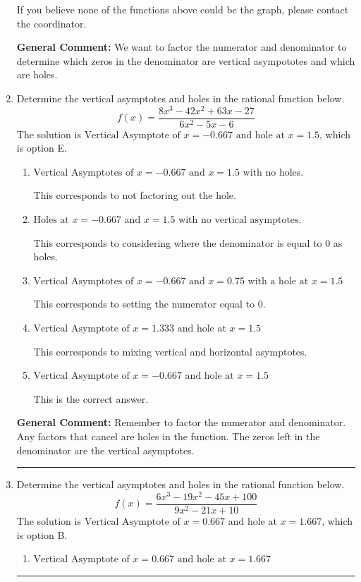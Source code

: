 \documentclass{extbook}[14pt]
\newcommand{\litem}[1]{\item #1

\rule{\textwidth}{0.4pt}}
\begin{document}
\begin{enumerate}
{\begin{enumerate}[label=\Alph*.]
If you believe none of the functions above could be the graph, please contact the coordinator.
\end{enumerate}

\textbf{General Comment:} We want to factor the numerator and denominator to determine which zeros in the denominator are vertical asympototes and which are holes.
}
\litem{
Determine the vertical asymptotes and holes in the rational function below.
\[ f(x) = \frac{8x^{3} -42 x^{2} +63 x -27}{6x^{2} -5 x -6} \]The solution is \( \text{Vertical Asymptote of } x = -0.667 \text{ and hole at } x = 1.5 \), which is option E.\begin{enumerate}[label=\Alph*.]
\item \( \text{Vertical Asymptotes of } x = -0.667 \text{ and } x = 1.5 \text{ with no holes.} \)

This corresponds to not factoring out the hole.
\item \( \text{Holes at } x = -0.667 \text{ and } x = 1.5 \text{ with no vertical asymptotes.} \)

This corresponds to considering where the denominator is equal to 0 as holes.
\item \( \text{Vertical Asymptotes of } x = -0.667 \text{ and } x = 0.75 \text{ with a hole at } x = 1.5 \)

This corresponds to setting the numerator equal to 0.
\item \( \text{Vertical Asymptote of } x = 1.333 \text{ and hole at } x = 1.5 \)

This corresponds to mixing vertical and horizontal asymptotes.
\item \( \text{Vertical Asymptote of } x = -0.667 \text{ and hole at } x = 1.5 \)

This is the correct answer.
\end{enumerate}

\textbf{General Comment:} Remember to factor the numerator and denominator. Any factors that cancel are holes in the function. The zeros left in the denominator are the vertical asymptotes.
}
\litem{
Determine the vertical asymptotes and holes in the rational function below.
\[ f(x) = \frac{6x^{3} -19 x^{2} -45 x + 100}{9x^{2} -21 x + 10} \]The solution is \( \text{Vertical Asymptote of } x = 0.667 \text{ and hole at } x = 1.667 \), which is option B.\begin{enumerate}[label=\Alph*.]
\item \( \text{Vertical Asymptote of } x = 0.667 \text{ and hole at } x = 1.667 \)


\end{enumerate}}
\end{enumerate}
\end{document}

